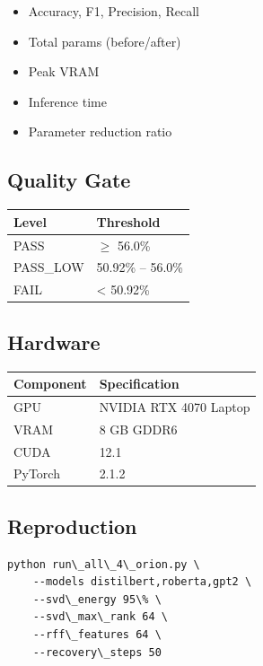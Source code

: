\begin{itemize}
\item Accuracy, F1, Precision, Recall
\item Total params (before/after)
\item Peak VRAM
\item Inference time
\item Parameter reduction ratio

\end{itemize}
\subsection{Quality Gate}

\begin{table}[H]
\centering
\small
\begin{tabular}{ll}
\toprule
\textbf{Level} & \textbf{Threshold} \\
\midrule
PASS & $\ge$ 56.0\% \\
PASS\_LOW & 50.92\% -- 56.0\% \\
FAIL & \textless{} 50.92\% \\
\bottomrule
\end{tabular}
\end{table}

\subsection{Hardware}

\begin{table}[H]
\centering
\small
\begin{tabular}{ll}
\toprule
\textbf{Component} & \textbf{Specification} \\
\midrule
GPU & NVIDIA RTX 4070 Laptop \\
VRAM & 8 GB GDDR6 \\
CUDA & 12.1 \\
PyTorch & 2.1.2 \\
\bottomrule
\end{tabular}
\end{table}

\subsection{Reproduction}

\begin{lstlisting}
python run\_all\_4\_orion.py \
    --models distilbert,roberta,gpt2 \
    --svd\_energy 95\% \
    --svd\_max\_rank 64 \
    --rff\_features 64 \
    --recovery\_steps 50
\end{lstlisting}

